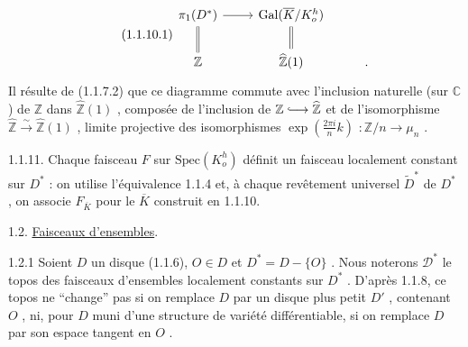 \begin{equation}\tag{1.1.10.1}
\begin{tikzcd}
\pi_1(D^*) \arrow[r] \arrow[d, equal] & \mathrm{Gal}(\overline{K}/K_o^h) \arrow[d, equal] & {} \\
\mathbb{Z} & \widehat{\mathbb{Z}}(1) & .
\end{tikzcd}
\end{equation}
Il résulte de (1.1.7.2) que ce diagramme commute avec l'inclusion naturelle (sur $\mathbb{C}$ ) de $\mathbb{Z}$ dans $\widehat{\mathbb{Z}}(1)$ , composée de l'inclusion de $\mathbb{Z} \lhook\joinrel\longrightarrow \widehat{\mathbb{Z}}$ et de l'isomorphisme $\widehat{\mathbb{Z}} \overset{\sim}{\longrightarrow} \widehat{\mathbb{Z}}(1)$ , limite projective des isomorphismes $\exp(\frac{2\pi i}{n} k )$ $: \mathbb{Z}/n \to \mu_n$ .

1.1.11. Chaque faisceau $F$ sur $\mathrm{Spec}(K_o^h)$ définit un faisceau localement constant sur $D^*$ : on utilise l'équivalence 1.1.4 et, à chaque revêtement universel $\widetilde{D}^*$ de $D^*$ , on associe $F_{\overline{K}}$ pour le $\overline{K}$ construit en 1.1.10.


1.2. \underline{Faisceaux d'ensembles}.

1.2.1 Soient $D$ un disque (1.1.6), $O \in D$ et $D^* = D-\{O\}$ . Nous noterons $\mathcal{D}^*$
le topos des faisceaux d'ensembles localement constants sur $D^*$ . D'après 1.1.8, ce topos ne ``change'' pas si on remplace $D$ par un disque plus petit $D'$ , contenant $O$ , ni, pour $D$ muni d'une structure de variété différentiable, si on remplace $D$ par son espace tangent en $O$ .

